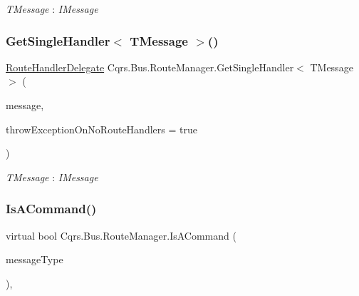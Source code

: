 \begin{Desc}
\item[Type Constraints]\begin{description}
\item[{\em T\+Message} : {\em I\+Message}]\end{description}
\end{Desc}
\mbox{\label{classCqrs_1_1Bus_1_1RouteManager_aa681cc48828440452f6984f198369e69}} 
\subsubsection{\texorpdfstring{Get\+Single\+Handler$<$ T\+Message $>$()}{GetSingleHandler< TMessage >()}\hspace{0.1cm}{\footnotesize\ttfamily [2/2]}}
{\footnotesize\ttfamily \hyperlink{classCqrs_1_1Bus_1_1RouteHandlerDelegate}{Route\+Handler\+Delegate} Cqrs.\+Bus.\+Route\+Manager.\+Get\+Single\+Handler$<$ T\+Message $>$ (\begin{DoxyParamCaption}\item[{T\+Message}]{message,  }\item[{bool}]{throw\+Exception\+On\+No\+Route\+Handlers = {\ttfamily true} }\end{DoxyParamCaption})}

\begin{Desc}
\item[Type Constraints]\begin{description}
\item[{\em T\+Message} : {\em I\+Message}]\end{description}
\end{Desc}
\mbox{\label{classCqrs_1_1Bus_1_1RouteManager_a7b7bfc4db30cc5956c4acd6a342e9159}} 
\subsubsection{\texorpdfstring{Is\+A\+Command()}{IsACommand()}}
{\footnotesize\ttfamily virtual bool Cqrs.\+Bus.\+Route\+Manager.\+Is\+A\+Command (\begin{DoxyParamCaption}\item[{Type}]{message\+Type }\end{DoxyParamCaption})\hspace{0.3cm}{\ttfamily [protected]}, {\ttfamily [virtual]}}

